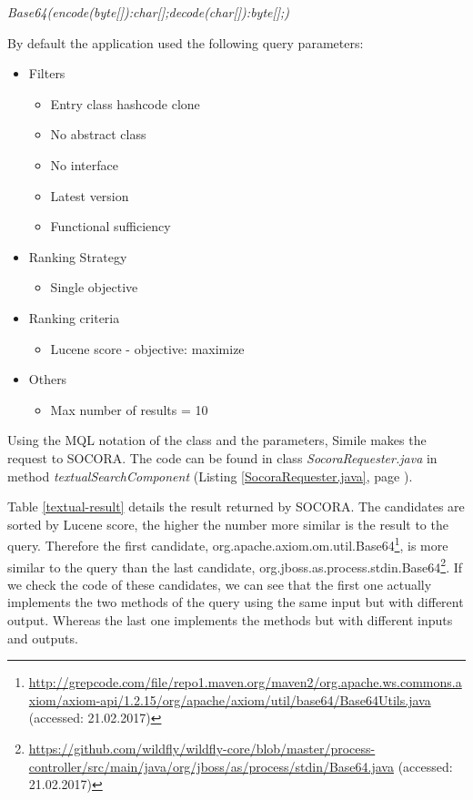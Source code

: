 {\begin{displayquote}
\emph{Base64(encode(byte[]):char[];decode(char[]):byte[];)}
\end{displayquote}

By default the application used the following query parameters:

\begin{itemize}
\item Filters
	\begin{itemize}
	\item Entry class hashcode clone
	\item No abstract class
	\item No interface
	\item Latest version
	\item Functional sufficiency
	\end{itemize}
\item Ranking Strategy
	\begin{itemize}
	\item Single objective
	\end{itemize}
\item Ranking criteria
	\begin{itemize}
	\item Lucene score - objective: maximize
	\end{itemize}
\item Others
	\begin{itemize}
	\item Max number of results = 10
	\end{itemize}
\end{itemize}

Using the MQL notation of the class and the parameters, Simile makes the request to SOCORA. The code can be found in class \emph{SocoraRequester.java} in method \emph{textualSearchComponent} (Listing \ref{SocoraRequester.java}, page \pageref{SocoraRequester.java}). 

Table \ref{textual-result} details the result returned by SOCORA. The candidates are sorted by Lucene score, the higher the number more similar is the result to the query. Therefore the first candidate, org.apache.axiom.om.util.Base64\footnote{\url{http://grepcode.com/file/repo1.maven.org/maven2/org.apache.ws.commons.axiom/axiom-api/1.2.15/org/apache/axiom/util/base64/Base64Utils.java} (accessed: 21.02.2017)}, is more similar to the query than the last candidate, org.jboss.as.process.stdin.Base64\footnote{\url{https://github.com/wildfly/wildfly-core/blob/master/process-controller/src/main/java/org/jboss/as/process/stdin/Base64.java} (accessed: 21.02.2017)}. If we check the code of these candidates, we can see that the first one actually implements the two methods of the query using the same input but with different output. Whereas the last one implements the methods but with different inputs and outputs.

}
